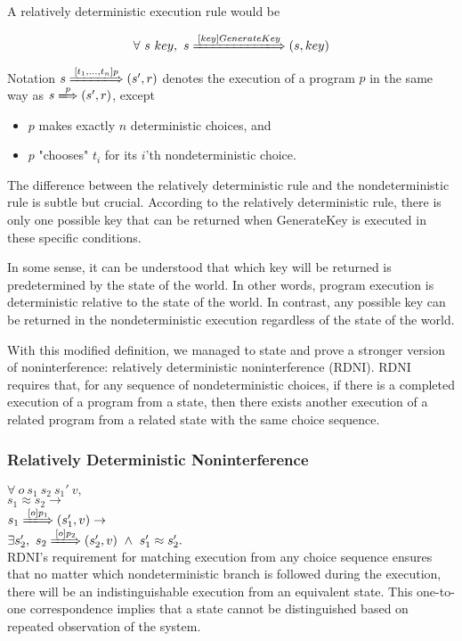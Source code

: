 A relatively deterministic execution rule would be

$$\forall\ s\ key,\ s  \xLongrightarrow{[key]GenerateKey} (s, key)$$ 

Notation $s \xLongrightarrow{[t_1, \dots, t_n]p} (s', r)$ denotes the execution of a program $p$ in the same way as $s \xLongrightarrow{p} (s', r)$, except
\begin{itemize}
	\item $p$ makes exactly $n$ deterministic choices, and
	\item $p$ "chooses" $t_i$ for its $i$'th nondeterministic choice.
\end{itemize}

The difference between the relatively deterministic rule and the nondeterministic rule is subtle but crucial. 
According to the relatively deterministic rule, there is only one possible key that can be returned when GenerateKey is executed in these specific conditions.

In some sense, it can be understood that which key will be returned is predetermined by the state of the world. In other words, program execution is deterministic relative to the state of the world.
In contrast, any possible key can be returned in the nondeterministic execution regardless of the state of the world.

With this modified definition, we managed to state and prove a stronger version of noninterference: relatively deterministic noninterference (RDNI). RDNI requires that, for any sequence of nondeterministic choices, if there is a completed execution of a program from a state, then there exists another execution of a related program from a related state with the same choice sequence.

\subsubsection*{Relatively Deterministic Noninterference}
$\forall\ o\ s_1\ s_2\ s_1'\ v,$\\[2pt]
$s_1\approx s_2 \rightarrow$\\[2pt]
$s_1 \xLongrightarrow{[o]p_1} (s_1', v) \rightarrow$\\[2pt]
$\exists s_2',\ s_2 \xLongrightarrow{[o]p_2} (s_2', v)\ \wedge\ s_1'\approx s_2'.$\\

RDNI's requirement for matching execution from any choice sequence ensures that no matter which nondeterministic branch is followed during the execution, there will be an indistinguishable execution from an equivalent state. This one-to-one correspondence implies that a state cannot be distinguished based on repeated observation of the system.

